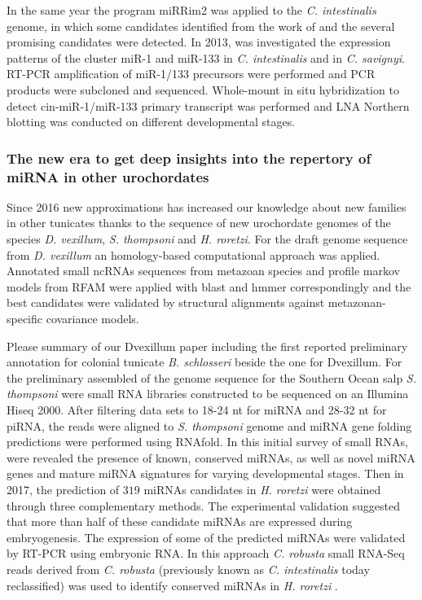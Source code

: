 \documentclass[graybox]{svmult}
\begin{document}
In the same year the program miRRim2 \cite{Terai2012} was applied to the \textit{C. intestinalis} genome, in which some candidates identified from the work of \cite{Hendrix2010} and the several promising candidates were detected. In 2013, \cite{Kusakabe2013} was investigated the expression patterns of the cluster miR-1 and miR-133 in \textit{C. intestinalis} and in \textit{C. savignyi}. RT-PCR amplification of miR-1/133 precursors were performed and PCR products were subcloned and sequenced. Whole-mount in situ hybridization to detect cin-miR-1/miR-133 primary transcript was performed and LNA Northern blotting was conducted on different developmental stages. 

\subsubsection{The new era to get deep insights into the repertory of miRNA in other urochordates}

Since 2016 new approximations has increased our knowledge about new families in other tunicates thanks to the sequence of new urochordate genomes of the species \textit{D. vexillum}, \textit{S. thompsoni} and \textit{H. roretzi}. 
For the draft genome sequence from \textit{D. vexillum} an homology-based computational approach was applied. Annotated small ncRNAs  sequences from metazoan species and profile markov models from RFAM were applied with blast and hmmer correspondingly and the best candidates were validated by structural alignments against metazonan-specific covariance models.   



Please summary of our Dvexillum paper \cite{Velandia-Huerto2016} including the first reported preliminary annotation for colonial tunicate \textit{B. schlosseri} beside the one for Dvexillum. For the preliminary assembled of the genome sequence for the Southern Ocean salp \textit{S. thompsoni} \cite{Jue2016} were small RNA libraries constructed to be sequenced on an Illumina Hiseq 2000. After filtering data sets to 18-24 nt for miRNA and 28-32 nt for piRNA, the reads were aligned to \textit{S. thompsoni} genome and miRNA gene folding predictions were performed using RNAfold. In this initial survey of small RNAs, were revealed the presence of known, conserved miRNAs, as well as novel miRNA genes and mature miRNA signatures for varying developmental stages. Then in 2017, the prediction of $319$ miRNAs candidates in \textit{H. roretzi} were obtained through three complementary methods. The experimental validation suggested that more than half of these candidate miRNAs are expressed during embryogenesis. The expression of some of the predicted miRNAs were validated by RT-PCR using embryonic RNA. In this approach \textit{C. robusta} small RNA-Seq reads derived from \textit{C. robusta} \cite{Shi2009} (previously known as  \textit{C. intestinalis} today reclassified) was used to identify conserved miRNAs in \textit{H. roretzi} \cite{Wang2017} .  
\end{document}

